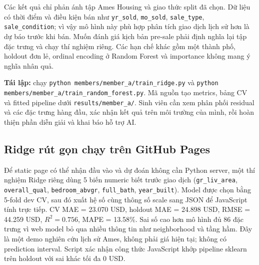 Các kết quả chỉ phản ánh tập Ames Housing và giao thức split đã chọn. Dữ liệu có
thời điểm và điều kiện bán như \texttt{yr\_sold}, \texttt{mo\_sold},
\texttt{sale\_type}, \texttt{sale\_condition}; vì vậy mô hình này phù hợp phân
tích giao dịch lịch sử hơn là dự báo trước khi bán. Muốn đánh giá kịch bản
pre-sale phải định nghĩa lại tập đặc trưng và chạy thí nghiệm riêng. Các hạn chế
khác gồm một thành phố, holdout đơn lẻ, ordinal encoding ở Random Forest và
importance không mang ý nghĩa nhân quả.

\textbf{Tái lập:} chạy \texttt{python members/member\_a/train\_ridge.py} và
\texttt{python members/member\_a/train\_random\_forest.py}. Mã nguồn tạo metrics,
bảng CV và fitted pipeline dưới \texttt{results/member\_a/}. Sinh viên cần xem
phân phối residual và các đặc trưng hàng đầu, xác nhận kết quả trên môi trường
của mình, rồi hoàn thiện phần diễn giải và khai báo hỗ trợ AI.

\subsection{Ridge rút gọn chạy trên GitHub Pages}

Để static page có thể nhận đầu vào và dự đoán không cần Python server, một thí
nghiệm Ridge riêng dùng 5 biến numeric biết trước giao dịch
(\texttt{gr\_liv\_area}, \texttt{overall\_qual}, \texttt{bedroom\_abvgr},
\texttt{full\_bath}, \texttt{year\_built}). Model được chọn bằng 5-fold dev CV,
sau đó xuất hệ số cùng thông số scale sang JSON để JavaScript tính trực tiếp.
CV MAE = 23.070 USD, holdout MAE = 24.898 USD, RMSE = 44.259 USD,
\(R^2=0.756\), MAPE = 13.58\%. Sai số cao hơn mô hình đủ 86 đặc trưng vì web
model bỏ qua nhiều thông tin như neighborhood và tầng hầm. Đây là một demo
nghiên cứu lịch sử Ames, không phải giá hiện tại; không có prediction interval.
Script xác nhận công thức JavaScript khớp pipeline sklearn trên holdout với sai
khác tối đa 0 USD.
